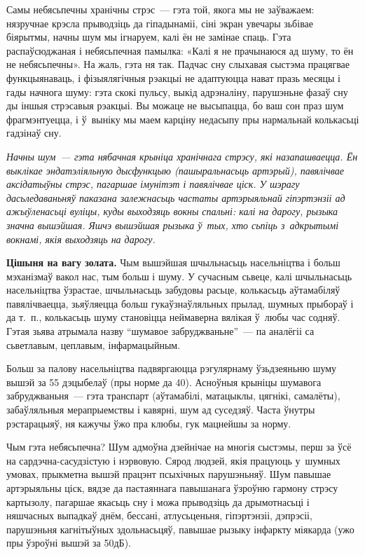 Самы небясьпечны хранічны стрэс~--- гэта той, якога мы не заўважаем: нязручнае крэсла прыводзіць да гіпадынаміі, сіні экран увечары зьбівае біярытмы, начны шум мы ігнаруем, калі ён не замінае спаць. Гэта распаўсюджаная і небясьпечная памылка: «Калі я не прачынаюся ад шуму, то ён не небясьпечны». На жаль, гэта ня так. Падчас сну слыхавая сыстэма працягвае функцыянаваць, і фізыялягічныя рэакцыі не адаптуюцца нават празь месяцы і гады начнога шуму: гэта скокі пульсу, выкід адрэналіну, парушэньне фазаў сну ды іншыя стрэсавыя рэакцыі. Вы можаце не высыпацца, бо ваш сон праз шум фрагмэнтуецца, і ў~выніку мы маем карціну недасыпу пры нармальнай колькасьці гадзінаў сну.

\emph{Начны шум~--- гэта нябачная крыніца хранічнага стрэсу, які назапашваецца. Ён выклікае эндатэліяльную дысфункцыю (пашыральнасьць артэрый), павялічвае аксідатыўны стрэс, пагаршае імунітэт і павялічвае ціск. У шэрагу дасьледаваньняў паказана залежнасьць частаты артэрыяльнай гіпэртэнзіі ад ажыўленасьці вуліцы, куды выходзяць вокны спальні: калі на дарогу, рызыка значна вышэйшая. Яшчэ вышэйшая рызыка ў~тых, хто сьпіць з~адкрытымі вокнамі, якія выходзяць на дарогу.}

\textbf{Цішыня на вагу золата.} Чым вышэйшая шчыльнасьць насельніцтва і больш мэханізмаў вакол нас, тым больш і шуму. У сучасным сьвеце, калі шчыльнасьць насельніцтва ўзрастае, шчыльнасьць забудовы расьце, колькасьць аўтамабіляў павялічваецца, зьяўляецца больш гукаўзнаўляльных прылад, шумных прыбораў і да т.~п., колькасьць шуму становіцца неймаверна вялікая ў~любы час содняў. Гэтая зьява атрымала назву ``шумавое забруджваньне''~--- па аналёгіі са сьветлавым, цеплавым, інфармацыйным.


Больш за палову насельніцтва падвяргаюцца рэгулярнаму ўзьдзеяньню шуму вышэй за 55 дэцыбелаў (пры норме да 40). Асноўныя крыніцы шумавога забруджваньня~--- гэта транспарт (аўтамабілі, матацыклы, цягнікі, самалёты), забаўляльныя мерапрыемствы і кавярні, шум ад суседзяў. Часта ўнутры рэстарацыяў, ня кажучы ўжо пра клюбы, гук мацнейшы за норму.

Чым гэта небясьпечна? Шум адмоўна дзейнічае на многія сыстэмы, перш за ўсё на сардэчна-сасудзістую і нэрвовую. Сярод людзей, якія працуюць у~шумных умовах, прыкметна вышэй працэнт псыхічных парушэньняў. Шум павышае артэрыяльны ціск, вядзе да пастаяннага павышанага ўзроўню гармону стрэсу картызолу, пагаршае якасьць сну і можа прыводзіць да дрымотнасьці і няшчасных выпадкаў днём, бессані, атлусьценьня, гіпэртэнзіі, дэпрэсіі, парушэньня кагнітыўных здольнасьцяў, павышае рызыку інфаркту міякарда (ужо пры ўзроўні вышэй за 50дБ).

